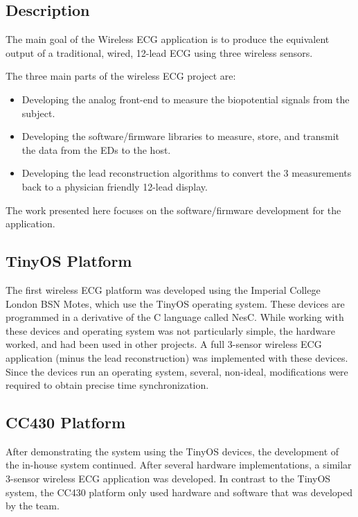 \documentclass{article}
\begin{document}
\subsection{Description}
The main goal of the Wireless ECG application is to produce the equivalent output of a traditional, wired, 12-lead ECG using three wireless sensors. 

The three main parts of the wireless ECG project are: 
\begin{itemize}
\item Developing the analog front-end to measure the biopotential signals from the subject.
\item Developing the software/firmware libraries to measure, store, and transmit the data from the EDs to the host.
\item Developing the lead reconstruction algorithms to convert the 3 measurements back to a physician friendly 12-lead display.
\end{itemize}
The work presented here focuses on the software/firmware development for the application.

\subsection{TinyOS Platform}
The first wireless ECG platform was developed using the Imperial College London BSN Motes, which use the TinyOS operating system. These devices are programmed in a derivative of the C language called NesC. While working with these devices and operating system was not particularly simple, the hardware worked, and had been used in other projects. A full 3-sensor wireless ECG application (minus the lead reconstruction) was implemented with these devices. Since the devices run an operating system, several, non-ideal, modifications were required to obtain precise time synchronization.

\subsection{CC430 Platform}
After demonstrating the system using the TinyOS devices, the development of the in-house system continued. After several hardware implementations, a similar 3-sensor wireless ECG application was developed. In contrast to the TinyOS system, the CC430 platform only used hardware and software that was developed by the team.
\end{document}
